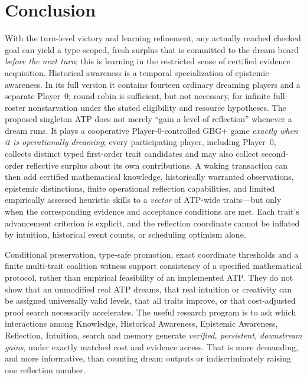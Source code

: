 \documentclass[11pt,letterpaper]{article}
\theoremstyle{definition}
\theoremstyle{plain}
\theoremstyle{definition}
\begin{document}
\section{Conclusion}\label{gl-first-W0-s19}
With the turn-level victory and learning refinement, any actually reached checked goal can yield a type-scoped, fresh surplus that is committed to the dream board \emph{before the next turn}; this is learning in the restricted sense of certified evidence acquisition. Historical awareness is a temporal specialization of epistemic awareness. In its full version it contains fourteen ordinary dreaming players and a separate Player~0; round-robin is sufficient, but not necessary, for infinite full-roster nonstarvation under the stated eligibility and resource hypotheses. The proposed singleton ATP does not merely ``gain a level of reflection'' whenever a dream runs. It plays a cooperative Player-0-controlled GBG+ game \emph{exactly when it is operationally dreaming}; every participating player, including Player~0, collects distinct typed first-order trait candidates and may also collect second-order reflective surplus about its own contributions. A waking transaction can then add certified mathematical knowledge, historically warranted observations, epistemic distinctions, finite operational reflection capabilities, and limited empirically assessed heuristic skills to a \emph{vector} of ATP-wide traits---but only when the corresponding evidence and acceptance conditions are met. Each trait's advancement criterion is explicit, and the reflection coordinate cannot be inflated by intuition, historical event counts, or scheduling optimism alone.

Conditional preservation, type-safe promotion, exact coordinate thresholds and a finite multi-trait coalition witness support consistency of a specified mathematical protocol, rather than empirical feasibility of an implemented ATP. They do not show that an unmodified real ATP dreams, that real intuition or creativity can be assigned universally valid levels, that all traits improve, or that cost-adjusted proof search necessarily accelerates. The useful research program is to ask which interactions among Knowledge, Historical Awareness, Epistemic Awareness, Reflection, Intuition, search and memory generate \emph{verified, persistent, downstream gains}, under exactly matched cost and evidence access. That is more demanding, and more informative, than counting dream outputs or indiscriminately raising one reflection number.
\end{document}

